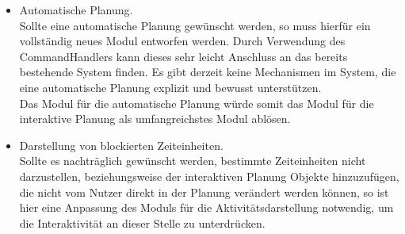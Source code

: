 \documentclass[fontsize=12pt,paper=a4,twoside]{scrartcl}
\begin{document}
\begin{itemize}
\item Automatische Planung.\\
Sollte eine automatische Planung gewünscht werden, so muss hierfür ein vollständig neues Modul entworfen werden. Durch Verwendung des CommandHandlers kann dieses sehr leicht Anschluss an das bereits bestehende System finden. Es gibt derzeit keine Mechanismen im System, die eine automatische Planung explizit und bewusst unterstützen.\\
Das Modul für die automatische Planung würde somit das Modul für die interaktive Planung als umfangreichstes Modul ablösen.\\

\item Darstellung von blockierten Zeiteinheiten.\\
Sollte es nachträglich gewünscht werden, bestimmte Zeiteinheiten nicht darzustellen, beziehungsweise der interaktiven Planung Objekte hinzuzufügen, die nicht vom Nutzer direkt in der Planung verändert werden können, so ist hier eine Anpassung des Moduls für die Aktivitätsdarstellung notwendig, um die Interaktivität an dieser Stelle zu unterdrücken.\\
\end{itemize}
\end{document}
